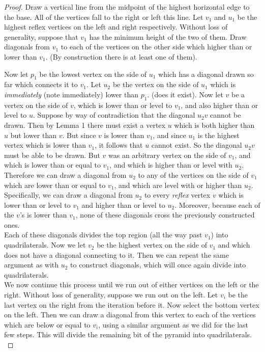 \documentclass[12pt]{article}
\theoremstyle{definition}
\begin{document}
\begin{proof} 

Draw a vertical line from the midpoint of the highest horizontal edge to the base. All of the vertices fall to the right or left this line. Let $v_1$ and $ u_1$ be the highest reflex vertices on the left and right respectively. Without loss of generality, suppose that $v_1$ has the minimum height of the two of them. Draw diagonals from $v_1$ to each of the vertices on the other side which higher than or lower than $v_1$. (By construction there is at least one of them).

Now let $p_1$ be the lowest vertex on the side of $u_1$ which has a diagonal drawn so far which connects it to $v_1$. Let $u_2$ be the vertex on the side of $u_1$ which is \textit{immediately} (note immediately) lower than $p_1$. (does it exist). Now let $v$ be a vertex on the side of $v$, which is lower than or level to $v_1$, and also higher than or level to $u$. Suppose by way of contradiction that the diagonal $u_2v$ cannot be drawn. Then by Lemma 1 there must exist a vertex $ u $ which is both higher than $u$ but lower than $v$. But since $v$ is lower than $v_1$, and since $u_1$ is the highest vertex which is lower than $v_1$, it follows that $u$ cannot exist. So the diagonal $u_2v$ must be able to be drawn. But $v$ was an arbitrary vertex on the side of $v_1$, and which is lower than or equal to $v_1$, and which is higher than or level with $u_2$. Therefore we can draw a diagonal from $u_2$ to any of the vertices on the side of $v_1$ which are lower than or equal to $v_1$, and which are level with or higher than $u_2$. Specifically, we can draw a diagonal from $u_2$ to every \textit{reflex} vertex $v$ which is lower than or level to $v_1$ and higher than or level to $u_2$. Moreover, because each of the $v$'s is lower than $v_1$, none of these diagonals cross the previously constructed ones. \\

Each of these diagonals divides the top region (all the way past $v_1$) into quadrilaterals. Now we let $v_2$ be the highest vertex on the side of $v_1$ and which does not have a diagonal connecting to it. Then we can repeat the same argument as with $u_2$ to construct diagonals, which will once again divide into quadrilaterals. \\

We now continue this process until we run out of either vertices on the left or the right. Without loss of generality, suppose we run out on the left. Let $v_i$ be the last vertex on the right from the iteration before it. Now select the bottom vertex on the left. Then we can draw a diagonal from this vertex to each of the vertices which are below or equal to $v_i$, using a similar argument as we did for the last few steps. This will divide the remaining bit of the pyramid into quadrilaterals. \\


\end{proof}
\end{document}
